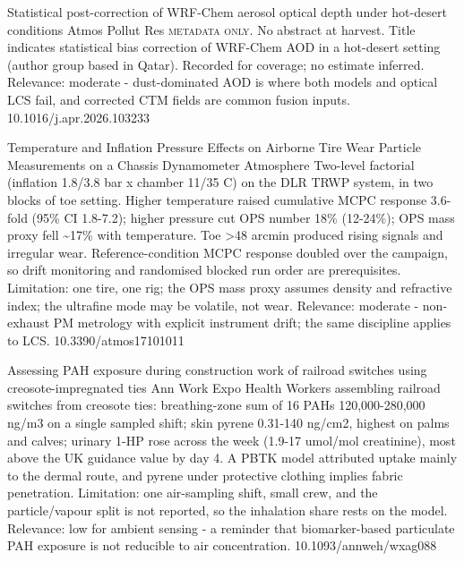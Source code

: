\documentclass[10pt]{article}
\begin{document}
{Statistical post-correction of WRF-Chem aerosol optical depth under hot-desert conditions}
{Atmos Pollut Res}
{\textsc{metadata only.} No abstract at harvest. Title indicates statistical bias correction of WRF-Chem AOD in a hot-desert setting (author group based in Qatar). Recorded for coverage; no estimate inferred. Relevance: moderate - dust-dominated AOD is where both models and optical LCS fail, and corrected CTM fields are common fusion inputs.}
{10.1016/j.apr.2026.103233}

{Temperature and Inflation Pressure Effects on Airborne Tire Wear Particle Measurements on a Chassis Dynamometer}
{Atmosphere}
{Two-level factorial (inflation 1.8/3.8 bar x chamber 11/35 C) on the DLR TRWP system, in two blocks of toe setting. Higher temperature raised cumulative MCPC response 3.6-fold (95\% CI 1.8-7.2); higher pressure cut OPS number 18\% (12-24\%); OPS mass proxy fell \textasciitilde{}17\% with temperature. Toe >48 arcmin produced rising signals and irregular wear. Reference-condition MCPC response doubled over the campaign, so drift monitoring and randomised blocked run order are prerequisites. Limitation: one tire, one rig; the OPS mass proxy assumes density and refractive index; the ultrafine mode may be volatile, not wear. Relevance: moderate - non-exhaust PM metrology with explicit instrument drift; the same discipline applies to LCS.}
{10.3390/atmos17101011}

\par{}\baselineskip{}\baselineskip
{}

{Assessing PAH exposure during construction work of railroad switches using creosote-impregnated ties}
{Ann Work Expo Health}
{Workers assembling railroad switches from creosote ties: breathing-zone sum of 16 PAHs 120,000-280,000 ng/m3 on a single sampled shift; skin pyrene 0.31-140 ng/cm2, highest on palms and calves; urinary 1-HP rose across the week (1.9-17 umol/mol creatinine), most above the UK guidance value by day 4. A PBTK model attributed uptake mainly to the dermal route, and pyrene under protective clothing implies fabric penetration. Limitation: one air-sampling shift, small crew, and the particle/vapour split is not reported, so the inhalation share rests on the model. Relevance: low for ambient sensing - a reminder that biomarker-based particulate PAH exposure is not reducible to air concentration.}
{10.1093/annweh/wxag088}
\end{document}
